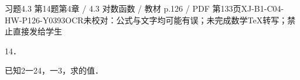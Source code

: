 \begin{bankitem}{习题4.3 第14题}{第4章 / 4.3 对数函数 / 教材 p.126 / PDF 第133页}{XJ-B1-C04-HW-P126-Y0393}{OCR未校对：公式与文字均可能有误；未完成数学TeX转写；禁止直接发给学生}
\begin{ocrdraft}
\par
14．
\par
已知2一24，一3，求的值．
\end{ocrdraft}
\end{bankitem}
